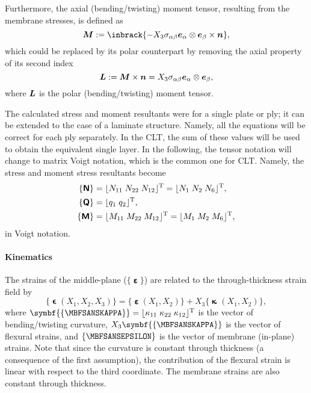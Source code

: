 	Furthermore, the axial (bending/twisting) moment tensor, resulting from the membrane stresses, is defined as
	\begin{equation}
	\tenb{M}\equidef \inbrack{-X_3 \sigma_{\alpha\beta}\base_\alpha\dyad\base_\beta\cross\tena{n}},
	\end{equation}
	which could be replaced by its polar counterpart by removing the axial property of its second index
	\begin{equation}
	\tenb{L}\equidef \tenb{M}\cross \tena{n} = X_3 \sigma_{\alpha\beta}\base_\alpha\dyad\base_\beta,
	\end{equation}
	where $\tenb{L}$ is the polar (bending/twisting) moment tensor. 
	
	The calculated stress and moment resultants were for a single plate or ply; it can be extended to the case of a laminate structure. Namely, all the equations will be correct for each ply separately. In the CLT, the sum of these values will be used to obtain the equivalent single layer. In the following, the tensor notation will change to matrix Voigt notation, which is the common one for CLT. Namely, the stress and moment stress resultants become
	\begin{align}
		\col{N}&=\lfloor N_{11}\;N_{22}\;N_{12}\rfloor^\tran=\lfloor N_{1}\;N_{2}\;N_{6}\rfloor^\tran,\\
		\col{q}&=\lfloor q_{1}\;q_{2}\rfloor^\tran,\\
		\col{M}&=\lfloor M_{11}\;M_{22}\;M_{12}\rfloor^\tran=\lfloor M_{1}\;M_{2}\;M_{6}\rfloor^\tran,
	\end{align}
	in Voigt notation.

\paragraph{Kinematics} 	The strains of the middle-plane ($\{\mbfsansepsilon\}$) are related to the through-thickness strain field by
	\begin{equation}
	 \{\mbfsansvarepsilon(X_1,X_2,X_3)\}	= \{\mbfsansepsilon (X_1,X_2)\}+X_3\{\mbfsanskappa(X_1,X_2)\},
	\end{equation}
	 where $\symbf{\col{\mbfsanskappa}}=\lfloor \kappa_{11}\;\kappa_{22}\;\kappa_{12} \rfloor^\tran$ is the vector of bending/twisting curvature, $X_3\symbf{\col{\mbfsanskappa}}$ is the vector of flexural strains, and $\col{\mbfsansepsilon}$ is the vector of membrane (in-plane) strains. Note that since the curvature is constant through thickness (a consequence of the first assumption), the contribution of the flexural strain is linear with respect to the third coordinate. The membrane strains are also constant through thickness.



